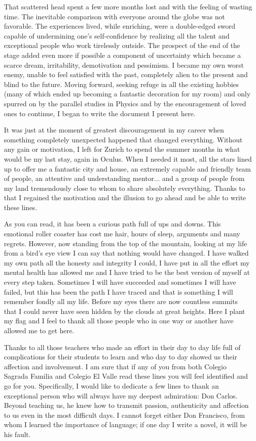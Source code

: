 That scattered head spent a few more months lost and with the feeling of wasting time. The inevitable comparison with everyone around the globe was not favorable. The experiences lived, while enriching, were a double-edged sword capable of undermining one's self-confidence by realizing all the talent and exceptional people who work tirelessly outside. The prospect of the end of the stage added even more if possible a component of uncertainty which became a scarce dream, irritability, demotivation and pessimism. I became my own worst enemy, unable to feel satisfied with the past, completely alien to the present and blind to the future. Moving forward, seeking refuge in all the existing hobbies (many of which ended up becoming a fantastic decoration for my room) and only spurred on by the parallel studies in Physics and by the encouragement of loved ones to continue, I began to write the document I present here.

It was just at the moment of greatest discouragement in my career when something completely unexpected happened that changed everything. Without any gain or motivation, I left for Zurich to spend the summer months in what would be my last stay, again in Oculus. When I needed it most, all the stars lined up to offer me a fantastic city and house, an extremely capable and friendly team of people, an attentive and understanding mentor... and a group of people from my land tremendously close to whom to share absolutely everything. Thanks to that I regained the motivation and the illusion to go ahead and be able to write these lines.

As you can read, it has been a curious path full of ups and downs. This emotional roller coaster has cost me hair, hours of sleep, arguments and many regrets. However, now standing from the top of the mountain, looking at my life from a bird's eye view I can say that nothing would have changed. I have walked my own path all the honesty and integrity I could, I have put in all the effort my mental health has allowed me and I have tried to be the best version of myself at every step taken. Sometimes I will have succeeded and sometimes I will have failed, but this has been the path I have traced and that is something I will remember fondly all my life.
Before my eyes there are now countless summits that I could never have seen hidden by the clouds at great heights. Here I plant my flag and I feel to thank all those people who in one way or another have allowed me to get here.

Thanks to all those teachers who made an effort in their day to day life full of complications for their students to learn and who day to day showed us their affection and involvement. I am sure that if any of you from both Colegio Sagrada Familia and Colegio El Valle read these lines you will feel identified and go for you. Specifically, I would like to dedicate a few lines to thank an exceptional person who will always have my deepest admiration: Don Carlos. Beyond teaching us, he knew how to transmit passion, authenticity and affection to us even in the most difficult days. I cannot forget either Don Francisco, from whom I learned the importance of language; if one day I write a novel, it will be his fault.

